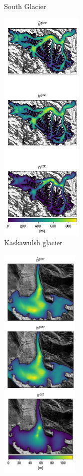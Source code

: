 \documentclass[a4, 12pt]{article}
\begin{document}
\begin{landscape}
\begin{figure}[h!]
{\begin{subfigure}{0.225\linewidth}
\caption{South Glacier}
\label{fig:fglate_sg_thickness}
\end{subfigure}
\hfill
\begin{subfigure}{0.225\linewidth}
\centering
\includegraphics[height=4.5in]{../imgs/Kaskawulsh glacier/farinotti_glate_thickness_all_models.png}
\caption{Kaskawulsh glacier}
\label{fig:fglate_kaska_thickness}
\end{subfigure}
\hfill
\begin{subfigure}{0.225\linewidth}
\centering
\includegraphics[height=4.5in]{../imgs/Job glacier/farinotti_glate_thickness_all_models.png}

\end{subfigure}}
\end{figure}
\end{landscape}
\end{document}
